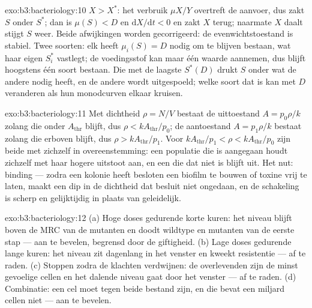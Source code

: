 \begin{solution}{exo:b3:bacteriology:10}
$X > X^{*}$: het verbruik $\mu X/Y$ overtreft de aanvoer, dus zakt $S$
onder $S^{*}$; dan is $\mu(S) < D$ en $\mathrm{d}X/\mathrm{d}t < 0$ en
zakt $X$ terug; naarmate $X$ daalt stijgt $S$ weer. Beide afwijkingen
worden gecorrigeerd: de evenwichtstoestand is stabiel. Twee soorten:
elk heeft $\mu_{i}(S) = D$ nodig om te blijven bestaan, wat haar eigen
$S_{i}^{*}$ vastlegt; de voedingsstof kan maar één waarde aannemen,
dus blijft hoogstens één soort bestaan. Die met de laagste $S^{*}(D)$
drukt $S$ onder wat de andere nodig heeft, en de andere wordt
uitgespoeld; welke soort dat is kan met $D$ veranderen als hun
monodcurven elkaar kruisen.
\end{solution}

\begin{solution}{exo:b3:bacteriology:11}
Met dichtheid $\rho = N/V$ bestaat de uittoestand $A = p_{0}\rho/k$
zolang die onder $A_{\text{thr}}$ blijft, dus $\rho < kA_{\text{thr}}/p_{0}$;
de aantoestand $A = p_{1}\rho/k$ bestaat zolang die erboven blijft, dus
$\rho
> kA_{\text{thr}}/p_{1}$. Voor $kA_{\text{thr}}/p_{1} < \rho <
kA_{\text{thr}}/p_{0}$ zijn beide met zichzelf in overeenstemming: een
populatie die is aangegaan houdt zichzelf met haar hogere uitstoot aan,
en een die dat niet is blijft uit. Het nut: binding --- zodra een
kolonie heeft besloten een biofilm te bouwen of toxine vrij te laten,
maakt een dip in de dichtheid dat besluit niet ongedaan, en de
schakeling is scherp en gelijktijdig in plaats van geleidelijk.
\end{solution}

\begin{solution}{exo:b3:bacteriology:12}
(a) Hoge doses gedurende korte kuren: het niveau blijft boven de MRC
van de mutanten en doodt wildtype en mutanten van de eerste stap ---
aan te bevelen, begrensd door de giftigheid. (b) Lage doses gedurende
lange kuren: het niveau zit dagenlang in het venster en kweekt
resistentie --- af te raden. (c) Stoppen zodra de klachten verdwijnen:
de overlevenden zijn de minst gevoelige cellen en het dalende niveau
gaat door het venster --- af te raden. (d) Combinatie: een cel moet
tegen beide bestand zijn, en die bevat een miljard cellen niet --- aan
te bevelen.
\end{solution}

